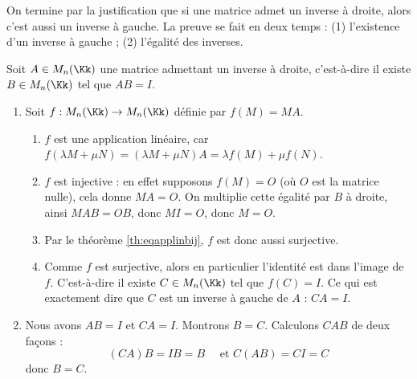 \documentclass[class=report,crop=false]{standalone}
\begin{document}
\begin{exemple}
On termine par la justification que si une matrice admet un inverse à droite, alors
c'est aussi un inverse à gauche.
La preuve se fait en deux temps : (1) l'existence d'un inverse à gauche ; (2) l'égalité des inverses.

Soit $A \in M_n(\Kk)$ une matrice admettant un inverse à droite, c'est-à-dire il existe
$B\in M_n(\Kk)$ tel que $AB = I$.

\begin{enumerate}
  \item Soit $f : M_n(\Kk) \to M_n(\Kk)$ définie
  par $f(M) = MA$.
  \begin{enumerate}
    \item $f$ est une application linéaire, car
    $f(\lambda M+\mu N) = (\lambda M+\mu N)A = \lambda f(M) + \mu f(N)$.

    \item $f$ est injective : en effet supposons $f(M)=O$ (où $O$ est la matrice nulle),
    cela donne $MA = O$. On multiplie cette égalité par $B$ à droite, ainsi
    $MAB = OB$, donc $MI = O$, donc $M=O$.

    \item Par le théorème \ref{th:eqapplinbij}, $f$ est donc aussi surjective.

    \item Comme $f$ est surjective, alors en particulier l'identité est dans l'image de $f$.
    C'est-à-dire il existe $C \in M_n(\Kk)$ tel que $f(C)=I$.
    Ce qui est exactement dire que $C$ est un inverse à gauche de $A$ : $CA=I$.

  \end{enumerate}


  \item Nous avons $AB = I$ et $CA=I$. Montrons $B=C$.
  Calculons $CAB$ de deux façons :
  $$(CA)B = IB= B \quad \text{ et } C(AB) = CI=C$$
  donc $B=C$.

\end{enumerate}

\end{exemple}




\end{document}
